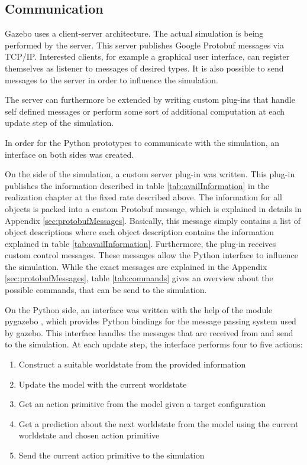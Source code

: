 \subsection{Communication}
Gazebo uses a client-server architecture. The actual simulation is being performed by the server.
This server publishes Google Protobuf \cite{protobuf} messages via TCP/IP. Interested clients, for example a graphical user interface, can register themselves as listener to messages of desired types. 
It is also possible to send messages to the server in order to influence the simulation. 

The server can furthermore be extended by writing custom plug-ins that handle self defined messages or perform some sort of additional computation at each update step of the simulation. 

In order for the Python prototypes to communicate with the simulation, an interface on both sides was created.

On the side of the simulation, a custom server plug-in was written. This plug-in publishes the information described in table \ref{tab:availInformation} in the realization chapter at the fixed rate described above. 
The information for all objects is packed into a custom Protobuf message, which is explained in details in Appendix \ref{sec:protobufMessages}. Basically, this message simply contains a list of object descriptions where each object description contains the information explained in table \ref{tab:availInformation}.
Furthermore, the plug-in receives custom control messages. These messages allow the Python interface to influence the simulation.
While the exact messages are explained in the Appendix \ref{sec:protobufMessages}, table \ref{tab:commands} gives an overview about the possible commands, that can be send to the simulation.

On the Python side, an interface was written with the help of the module pygazebo \cite{pygazebo}, which provides Python bindings for the message passing system used by gazebo. This interface handles the messages that are received from and send to the simulation. 
At each update step, the interface performs four to five actions:
\begin{enumerate}
\item Construct a suitable worldstate from the provided information
\item Update the model with the current worldstate
\item Get an action primitive from the model given a target configuration
\item Get a prediction about the next worldstate from the model using the current worldstate and chosen action primitive
\item Send the current action primitive to the simulation
\end{enumerate}

